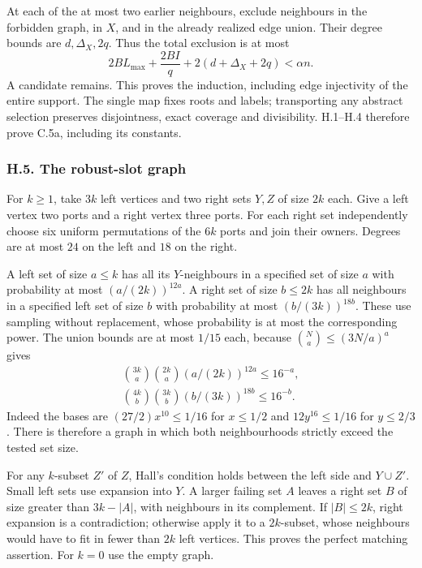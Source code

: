 \documentclass[english,11pt,a4paper]{article}
\begin{document}
At each of the at most two earlier neighbours, exclude neighbours in the forbidden graph, in \(X\), and in the already realized edge union. Their degree bounds are \(d,\Delta_X,2q\). Thus the total exclusion is at most \[2BL_{\max}+\frac{2BI}{q}+2(d+\Delta_X+2q)<\alpha n.\] A candidate remains. This proves the induction, including edge injectivity of the entire support. The single map fixes roots and labels; transporting any abstract selection preserves disjointness, exact coverage and divisibility. H.1--H.4 therefore prove C.5a, including its constants.

\subsubsection{H.5. The robust-slot graph}\label{h.5.-the-robust-slot-graph}

For \(k\ge1\), take \(3k\) left vertices and two right sets \(Y,Z\) of size \(2k\) each. Give a left vertex two ports and a right vertex three ports. For each right set independently choose six uniform permutations of the \(6k\) ports and join their owners. Degrees are at most \(24\) on the left and \(18\) on the right.

A left set of size \(a\le k\) has all its \(Y\)-neighbours in a specified set of size \(a\) with probability at most \((a/(2k))^{12a}\). A right set of size \(b\le2k\) has all neighbours in a specified left set of size \(b\) with probability at most \((b/(3k))^{18b}\). These use sampling without replacement, whose probability is at most the corresponding power. The union bounds are at most \(1/15\) each, because \(\binom Na\le(3N/a)^a\) gives \[\begin{gathered}
\binom{3k}{a}\binom{2k}{a}(a/(2k))^{12a}\le16^{-a},\\
\binom{4k}{b}\binom{3k}{b}(b/(3k))^{18b}\le16^{-b}.
\end{gathered}\] Indeed the bases are \((27/2)x^{10}\le1/16\) for \(x\le1/2\) and \(12y^{16}\le1/16\) for \(y\le2/3\). There is therefore a graph in which both neighbourhoods strictly exceed the tested set size.

For any \(k\)-subset \(Z'\) of \(Z\), Hall's condition holds between the left side and \(Y\cup Z'\). Small left sets use expansion into \(Y\). A larger failing set \(A\) leaves a right set \(B\) of size greater than \(3k-|A|\), with neighbours in its complement. If \(|B|\le2k\), right expansion is a contradiction; otherwise apply it to a \(2k\)-subset, whose neighbours would have to fit in fewer than \(2k\) left vertices. This proves the perfect matching assertion. For \(k=0\) use the empty graph.
\end{document}
